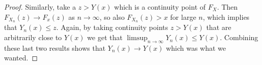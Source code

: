 \begin{proof}
Similarly, take a $z>Y(x)$ which is a continuity
point of $F_X$. Then $F_{X_n}(z)\to F_x(z)$ as
$n\to\infty$, so also $F_{X_n}(z)>x$ for large $n$,
which implies that $Y_n(x)\le z$. Again, by taking
continuity points $z>Y(x)$ that are arbitrarily close
to $Y(x)$ we get that
$\limsup_{n\to\infty} Y_n(x) \le Y(x)$. Combining
these last two results shows that $Y_n(x)\to Y(x)$
which was what we wanted.
\end{proof}
